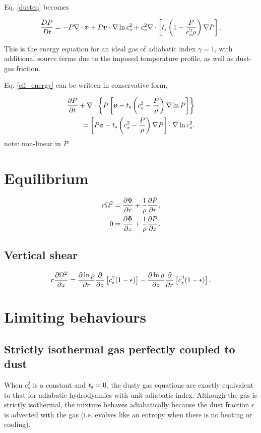 Eq. \ref{dusteq} becomes

\begin{align}
\frac{DP}{Dt} = - P \nabla\cdot\bm{v} + P\bm{v}\cdot\nabla\ln{c_s^2} +
c_s^2 \nabla\cdot\left[t_\mathrm{s}\left(1 - \frac{P}{c_s^2\rho}\right)\nabla
  P\right]. \label{eff_energy}
\end{align}

This is the energy equation for an ideal gas of adiabatic index
$\gamma=1$, with additional source terms due to the imposed
temperature profile, as well as dust-gas friction.  

Eq. \ref{eff_energy} can be written in conservative form,

\begin{align*}
  \frac{\partial P}{ \partial t} + \nabla\cdot\left\{P\left[\bm{v} -
      t_\mathrm{s}\left(c_s^2 - \frac{P}{\rho}\right)\nabla\ln{P}\right]
    \right\}\\
  = \left[P\bm{v} - t_\mathrm{s}\left(c_s^2 - \frac{P}{\rho}\right)\nabla
    P\right]\cdot\nabla\ln{c_s^2}. 
\end{align*}
note: non-linear in $P$

\section{Equilibrium}

\begin{align}
  r\Omega^2 &= \frac{\partial \Phi}{\partial r} + \frac{1}{\rho}\frac{\partial P}{\partial
    r},\\
  0 & = \frac{\partial\Phi}{\partial z} + \frac{1}{\rho}\frac{\partial P}{\partial z}.
\end{align}

\subsection{Vertical shear}

\begin{align}\label{vshear}
  r\frac{\partial \Omega^2}{\partial z} = \frac{\partial\ln{\rho}}{\partial r}\frac{\partial}{\partial
    z}\left[c_s^2(1-\epsilon)\right] - \frac{\partial\ln{\rho}}{\partial z}
  \frac{\partial}{\partial r} \left[c_s^2(1-\epsilon)\right]. 
\end{align}


\section{Limiting behaviours}

\subsection{Strictly isothermal gas perfectly coupled to dust}  
When $c_s^2$ is a constant and $t_\mathrm{s}=0$, the dusty gas equations are
exactly equivalent to that for adiabatic hydrodyamics with unit adiabatic
index. Although the gas is strictly isothermal, the mixture behaves 
adiabatically because the dust fraction $\epsilon$ is advected with
the gas (i.e. evolves like an entropy when there is no heating or
cooling). 

